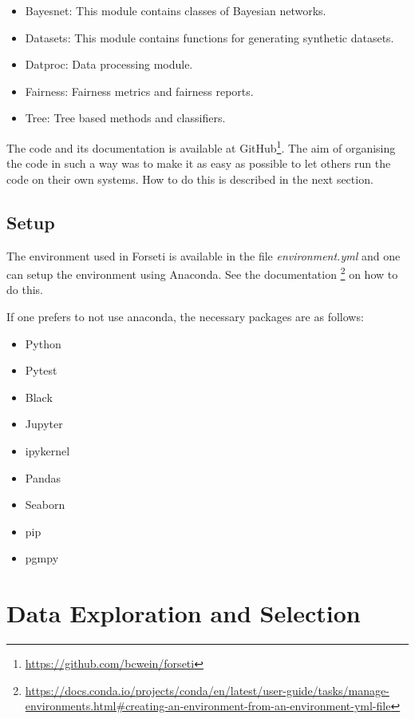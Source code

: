 \begin{itemize}
    \item Bayesnet: This module contains classes of Bayesian networks.
    \item Datasets: This module contains functions for generating synthetic datasets.
    \item Datproc: Data processing module.
    \item Fairness: Fairness metrics and fairness reports.
    \item Tree: Tree based methods and classifiers.
\end{itemize}

The code and its documentation is available at GitHub\footnote{\url{https://github.com/bcwein/forseti}}. The aim of organising the code in such a way was to make it as easy as possible to let others run the code on their own systems. How to do this is described in the next section.

\subsection{Setup}

The environment used in Forseti is available in the file \emph{environment.yml} and one can setup the environment using Anaconda. See the documentation \footnote{\url{https://docs.conda.io/projects/conda/en/latest/user-guide/tasks/manage-environments.html\#creating-an-environment-from-an-environment-yml-file}} on how to do this.

If one prefers to not use anaconda, the necessary packages are as follows:

\begin{itemize}
    \item Python
    \item Pytest
    \item Black
    \item Jupyter
    \item ipykernel
    \item Pandas
    \item Seaborn
    \item pip
    \item pgmpy
\end{itemize}

\section{Data Exploration and Selection}

